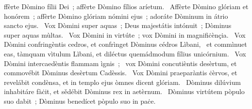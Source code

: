 \psalmChapterWithInscription{}
{ }
{%
ffèrte Dòmino fílii Dei~; affèrte Dòmino fílios aríetum. 
~Affèrte Dòmino glóriam et honórem~; affèrte Dòmino glóriam nómini ejus~; adoráte Dòminum in átrio sancto ejus. 
~Vox Dòmini super aquas~; Deus majestátis intónuit~; Dòminus super aquas mùltas. 
~Vox Dòmini in virtúte~; vox Dòmini in magnifiċènçia. 
~Vox Dòmini confringèntis cedros, et confrìnget Dòminus cédros Lìbani, 
~et commìnuet eas, tàmquam vìtulum Lìbani, et diléctus quemádmodum fílius unicórnium. 
~Vox Dòmini intercaedèntis flammam ìgnis~; 
~vox Dòmini concutièntis desèrtum, et commovébit Dòminus desèrtum Cadèssis. 
~Vox Dòmini praeparàntis ċèrvos, et revelábit condènsa, et in templo ejus òmnes dicent glóriam. 
~Dòminus dilúvium inhabitáre fàċit, et sědébit Dòminus rex in aetèrnum. 
~Dòminus virtútem pòpulo suo dabit~; Dòminus benedícet pòpulo suo in paċe. 
}
